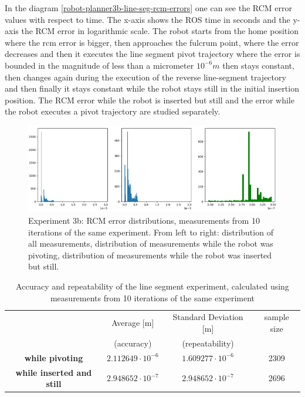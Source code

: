 In the diagram \ref{robot-planner3b-line-seg-rcm-errors} one can see the RCM error values with respect to time. The x-axis shows the ROS time in seconds and the y-axis the RCM error in logarithmic scale. The robot starts from 
the home position where the rcm error is bigger, then approaches the fulcrum point, 
where the error decreases and then it executes the line segment pivot trajectory where the error is bounded in the magnitude of less than a micrometer $10^{-6}m$ then stays constant, then changes again during the execution of 
the reverse line-segment trajectory and then finally it stays constant while the robot stays still in the initial insertion position. The RCM error while the robot is inserted but still and the error while the robot executes 
a pivot trajectory are studied separately.

\begin{center}
\begin{figure}[!htb]
\centering
\includegraphics[width=\textwidth]{images/robot_planner3/robot_planner3b-error_distributions.png}
\caption{Experiment 3b: RCM error distributions, measurements from 10 iterations of the same experiment. From left to right: distribution of all measurements, distribution of measurements while the robot was pivoting, 
distribution of measurements while the robot was inserted but still.}
\label{robot-planner3b-line-seg-rcm-error-distributions}
\end{figure}
\end{center}

\begin{table}[!htb]
\centering
\begin{tabular}{ |c|c|c|c| } 
\hline
 & Average [m] & Standard Deviation [m] & sample size \\
 & (accuracy) & (repeatability) & \\
\hline
\textbf{while pivoting} & $2.112649 \cdot 10^{-6}$ & $1.609277 \cdot 10^{-6}$ & 2309 \\
\hline
\textbf{while inserted and still} & $2.948652 \cdot 10^{-7}$ & $2.948652 \cdot 10^{-7}$ & 2696 \\
\hline
\end{tabular}
\caption{Accuracy and repeatability of the line segment experiment, calculated using measurements from 10 iterations of the same experiment}
\end{table}

